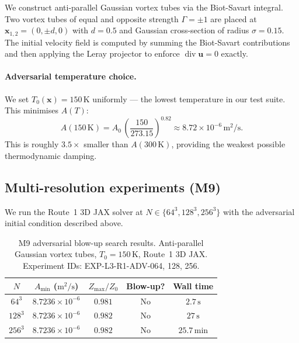 \documentclass[12pt]{article}
\newcommand{\Div}{\operatorname{div}}
\begin{document}
We construct anti-parallel Gaussian vortex tubes via the Biot-Savart integral.
Two vortex tubes of equal and opposite strength $\Gamma = \pm 1$ are placed at
$\mathbf{x}_{1,2} = (0, \pm d, 0)$ with $d = 0.5$ and Gaussian cross-section of
radius $\sigma = 0.15$.  The initial velocity field is computed by summing the
Biot-Savart contributions and then applying the Leray projector to enforce
$\Div\mathbf{u} = 0$ exactly.

\paragraph{Adversarial temperature choice.}
We set $T_0(\mathbf{x}) = 150\,\mathrm{K}$ uniformly --- the lowest temperature
in our test suite.  This minimises $A(T)$:
\begin{equation}
  \label{eq:A-150K}
  A(150\,\mathrm{K}) = A_0\,\left(\frac{150}{273.15}\right)^{0.82}
                     \approx 8.72\times10^{-6}\,\mathrm{m}^2/\mathrm{s}.
\end{equation}
This is roughly $3.5\times$ smaller than $A(300\,\mathrm{K})$, providing the
weakest possible thermodynamic damping.

\subsection{Multi-resolution experiments (M9)}
\label{ssec:blowup-results}

We run the Route~1 3D JAX solver at $N \in \{64^3, 128^3, 256^3\}$ with the
adversarial initial condition described above.

\begin{table}[ht]
  \centering
  \caption{M9 adversarial blow-up search results. Anti-parallel Gaussian vortex
    tubes, $T_0 = 150\,\mathrm{K}$, Route~1 3D JAX.
    Experiment IDs: EXP-L3-R1-ADV-064, 128, 256.}
  \label{tab:blowup}
  \begin{tabular}{ccccc}
    \toprule
    $N$ & $A_{\min}$ ($\mathrm{m}^2/\mathrm{s}$) & $Z_{\max}/Z_0$
        & Blow-up? & Wall time \\
    \midrule
    $64^3$  & $8.7236\times10^{-6}$ & $0.981$ & No & $2.7\,\mathrm{s}$ \\
    $128^3$ & $8.7236\times10^{-6}$ & $0.982$ & No & $27\,\mathrm{s}$ \\
    $256^3$ & $8.7236\times10^{-6}$ & $0.982$ & No & $25.7\,\mathrm{min}$ \\
    \bottomrule
  \end{tabular}
\end{table}
\end{document}
